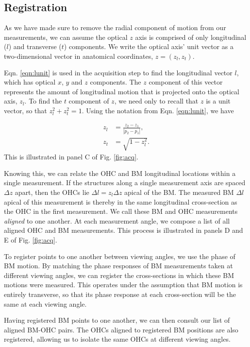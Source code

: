 \documentclass[aip,cp,amsmath,amssymb,reprint]{revtex4-2}
\begin{document}
\subsection{\label{sec:registration}Registration}

\par{As we have made sure to remove the radial component of motion from our measurements, we can assume the optical $z$ axis is comprised of only longitudinal ($l$) and transverse ($t$) components. We write the optical axis’ unit vector as a two-dimensional vector in anatomical
coordinates, $z = (z_l, z_t)$.
}
\par{Eqn. \ref{eqn:lunit} is used in the acquisition step to find the longitudinal vector $l$, which has optical $x$, $y$ and $z$ components. The $z$ component of this vector represents the amount of longitudinal motion that is projected onto the optical axis, $z_l$. To find the $t$ component of $z$, we need only to recall that $z$ is a unit vector, so that $z_l^2 + z_t^2 = 1$. Using the notation from Eqn. \ref{eqn:lunit}, we have

	\begin{align}
		z_l &= \frac{z_2-z_1}{|p_2-p_1|},\\
		z_t &= \sqrt{1-z_l^2}.
	\end{align}
This is illustrated in panel C of Fig. \ref{fig:acq}.}
\par{Knowing this, we can relate the OHC and BM longitudinal locations within a single measurement. If the structures along a single measurement axis are spaced $\Delta z$ apart, then the OHCs lie $\Delta l = z_l \Delta z$ apical of the BM. The measured BM $\Delta l$ apical of this measurement is thereby in the same longitudinal cross-section as the OHC in the first measurement. We call these BM and OHC measurements \textit{aligned} to one another. At each measurement angle, we compose a list of all aligned OHC and BM measurements. This process is illustrated in panels D and E of Fig. \ref{fig:acq}.}
\par{To register points to one another between viewing angles, we use the phase of BM motion. By matching the phase responses of BM measurements taken at different viewing angles, we can register the cross-sections in which these BM motions were measured. This operates under the assumption that BM motion is entirely transverse, so that its phase response at each cross-section will be the same at each viewing angle. }
\par{Having registered BM points to one another, we can then consult our list of aligned BM-OHC pairs. The OHCs aligned to registered BM positions are also registered, allowing us to isolate the same OHCs at different viewing angles.}
\end{document}
